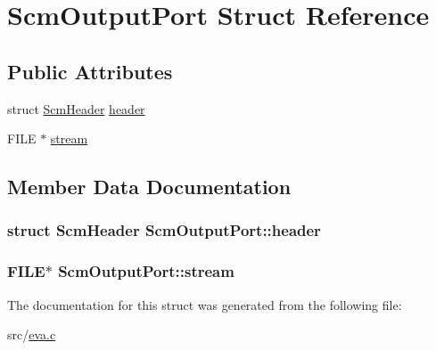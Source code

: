 \hypertarget{struct_scm_output_port}{\section{Scm\-Output\-Port Struct Reference}
\label{struct_scm_output_port}
}
\subsection*{Public Attributes}
\begin{DoxyCompactItemize}
\item 
struct \hyperlink{struct_scm_header}{Scm\-Header} \hyperlink{struct_scm_output_port_ad222b0065d5ae9c0012e7d94797fda17}{header}
\item 
F\-I\-L\-E $\ast$ \hyperlink{struct_scm_output_port_a2549210e21309514c821d73e1efcd7e6}{stream}
\end{DoxyCompactItemize}


\subsection{Member Data Documentation}
\hypertarget{struct_scm_output_port_ad222b0065d5ae9c0012e7d94797fda17}{
\subsubsection[{header}]{\setlength{\rightskip}{0pt plus 5cm}struct {\bf Scm\-Header} Scm\-Output\-Port\-::header}}\label{struct_scm_output_port_ad222b0065d5ae9c0012e7d94797fda17}
\hypertarget{struct_scm_output_port_a2549210e21309514c821d73e1efcd7e6}{
\subsubsection[{stream}]{\setlength{\rightskip}{0pt plus 5cm}F\-I\-L\-E$\ast$ Scm\-Output\-Port\-::stream}}\label{struct_scm_output_port_a2549210e21309514c821d73e1efcd7e6}


The documentation for this struct was generated from the following file\-:\begin{DoxyCompactItemize}
\item 
src/\hyperlink{eva_8c}{eva.\-c}\end{DoxyCompactItemize}
